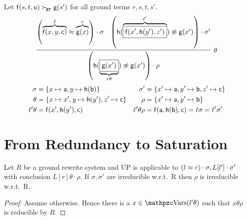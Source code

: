    \begin{example}
        Let \( \mathsf{f}(s,t,u)\mathrel\succ_{\!\mathtt{gr}}\mathsf{g}(s') \) for all ground terms
       \( r,s,t,s' \).
       \begin{gather*}
           \infer[\theta]{
               \left(
                   \mh(\underbrace{
                       \boxed{\mg(x')}
                        }_{r\theta})\mNE\mg(x')
                   \right)\cdot\rho
            }{
               \left(
                   \overbrace{\mf(x,y,\mc)}^{\ell}
                   \mEQ
                   \overbrace{\mg(x)}^r
               \right)\cdot \sigma
            & \left(
               \mh(\overbrace{
                   \boxed{\mf(x',\mh(y'), z')}
                    }^{\ell'})\mNE\mg(x')
               \right)\cdot \sigma'
            }
       \end{gather*}
       \begin{align*}
           \sigma &= \{x\mapsto\mathsf{a}, y\mapsto\mathsf{h}(\mathsf{b})\} &
            \sigma' &= \{x'\mapsto\mathsf{a}, y'\mapsto\mathsf{b}, z'\mapsto\mathsf{c} \}
            \\
            \theta &= \{x\mapsto x',y\mapsto\mathsf{h}(y'),z'\mapsto\mathsf{c} \}
              &
            \rho &=\{ x'\mapsto \mathsf{a}, y'\mapsto \mathsf{b} \}
            \\
            \ell'\theta &= \mathsf{f}(x',\mathsf{h}(y'),\mathsf{c})
             &
            \ell'\theta\rho &= \mathsf{f}(\mathsf{a}, \mathsf{h}(\mathsf{b}), \mathsf{c}) = \ell\sigma = \ell'\sigma'
       \end{align*}
   \end{example}

   \section{From Redundancy to Saturation}

   \begin{lemma}
        Let \( R \) be a ground rewrite system and UP is applicable to
       \( (l\approx r)\cdot\sigma, L[l']\cdot\sigma' \)
        with conclusion
       \( L[r]\theta\cdot\rho \).
        If \( \sigma,\sigma' \) are irreducible w.r.t.~R then \( \rho \) is irreducible w.r.t.~R.
   \end{lemma}

   \begin{proof}
        Assume otherwise.
        Hence there is a \(
            x\in\var(l'\theta)
        \) such that
       \( x\theta\rho \) is reducible by \(
            R
            \).

   \end{proof}

